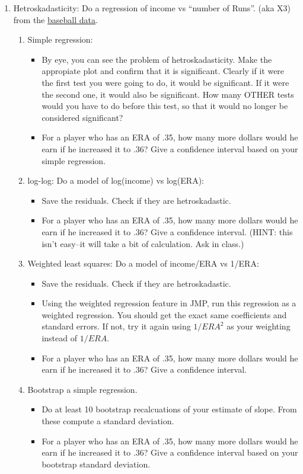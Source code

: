 \documentclass[11pt]{article}
\begin{document}
\begin{enumerate}
\item Hetroskadasticity: Do a regression of income vs ``number of
Runs''. (aka X3) from the \href{http://www4.stat.ncsu.edu/~boos/var.select/baseball.html}{baseball data}.
\begin{enumerate}
\item Simple regression:
\begin{itemize}
\item By eye, you can see the problem of hetroskadasticity.  Make the
appropiate plot and confirm that it is significant.  Clearly if it
were the first test you were going to do, it would be significant.  If
it were the second one, it would also be significant.  How many OTHER
tests would you have to do before this test, so that it would no
longer be considered significant?
\item For a player who has an ERA of .35, how many more dollars would
he earn if he increased it to .36?  Give a confidence interval based
on your simple regression.
\end{itemize}
\item log-log:  Do a model of log(income) vs log(ERA):
\begin{itemize}
\item  Save the residuals.  Check if they are hetroskadastic.
\item For a player who has an ERA of .35, how many more dollars would
he earn if he increased it to .36?  Give a confidence interval. (HINT:
this isn't easy--it will take a bit of calculation.  Ask in class.)
\end{itemize}
\item Weighted least squares:  Do a model of income/ERA vs 1/ERA:
\begin{itemize}
\item  Save the residuals.  Check if they are hetroskadastic.
\item Using the weighted regression feature in JMP, run this
regression as a weighted regression.  You should get the exact same
coefficients and standard errors.  If not, try it again using
$1/ERA^2$ as your weighting instead of $1/ERA$.
\item For a player who has an ERA of .35, how many more dollars would
he earn if he increased it to .36?  Give a confidence interval. 
\end{itemize}
\item Bootstrap a simple regression.
\begin{itemize}
\item Do at least 10 bootstrap recalcuations of your estimate of
slope.  From these compute a standard deviation.
\item For a player who has an ERA of .35, how many more dollars would
he earn if he increased it to .36?  Give a confidence interval based
on your bootstrap standard deviation.
\end{itemize}
\end{enumerate}
\end{enumerate}
\end{document}
